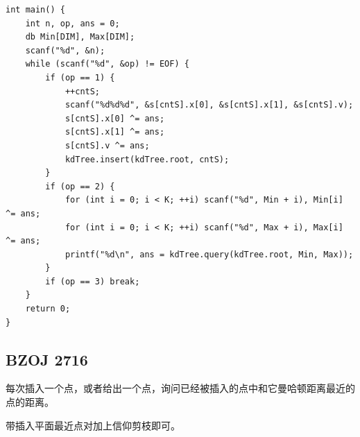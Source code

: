 \begin{lstlisting}
int main() {
	int n, op, ans = 0;
	db Min[DIM], Max[DIM];	
    scanf("%d", &n);
    while (scanf("%d", &op) != EOF) {
        if (op == 1) {
			++cntS;
            scanf("%d%d%d", &s[cntS].x[0], &s[cntS].x[1], &s[cntS].v);
            s[cntS].x[0] ^= ans;
            s[cntS].x[1] ^= ans;
            s[cntS].v ^= ans;
            kdTree.insert(kdTree.root, cntS);
        }
        if (op == 2) {
			for (int i = 0; i < K; ++i) scanf("%d", Min + i), Min[i] ^= ans;
			for (int i = 0; i < K; ++i) scanf("%d", Max + i), Max[i] ^= ans;
            printf("%d\n", ans = kdTree.query(kdTree.root, Min, Max));
        }
        if (op == 3) break;
    }
	return 0;
}
\end{lstlisting}

\subsection{BZOJ 2716}

每次插入一个点，或者给出一个点，询问已经被插入的点中和它曼哈顿距离最近的点的距离。\par

带插入平面最近点对加上信仰剪枝即可。\par

